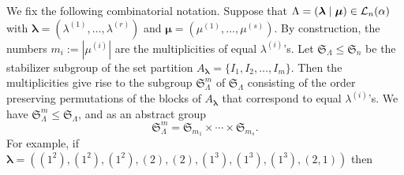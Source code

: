 \documentclass[10pt,a4,twoside,hidelinks,rm]{article}
\newcommand{\Si}{\mathfrak{S}}
\newcommand\blambda{{\boldsymbol\lambda}}
\newcommand\bmu{{\boldsymbol\mu}}
\theoremstyle{plain}
\begin{document}
\medskip
We fix the following combinatorial notation.
Suppose that $ \Lambda=(\blambda \mid \bmu) \in  {\cal L}_n(\alpha) $ 
with
$ \blambda = ( \lambda^{ (1 ) }, \ldots,  \lambda^{ (r ) }) $ and
$ \bmu = ( \mu^{ (1 ) }, \ldots,  \mu^{ (s ) })$.  
By construction, the numbers $ m_i := |   \mu^{ (i ) }  | $ are the 
multiplicities of equal $ \lambda^{(i)}$'s.
Let $\Si_{\Lambda} \leq \Si_{n}$ be the stabilizer subgroup of the set
partition $ A_{\blambda} {=\{I_1, I_2, \ldots,
I_m\}} $. Then
the multiplicities give rise to the subgroup $ \Si^m_{\Lambda} $ of $ \Si_{\Lambda}$
consisting of the order preserving permutations of
the blocks of $ A_{\blambda} $ that correspond to equal $ \lambda^{(i)}$'s.
We have $ \Si^m_{\Lambda} \leq  \Si_{{\Lambda}}$, and 
as an abstract group 
\begin{equation}\label{abstractgroup}  \Si^m_{\Lambda}  = \Si_{m_1}  \times \cdots \times \Si_{m_s}.
\end{equation}  
For example, if $ \blambda= ( (1^2), (1^2), (1^2), (2), (2), (1^3), (1^3), (1^3), (2,1) ) $
then 
\end{document}
